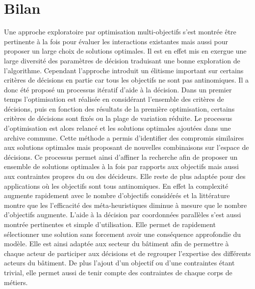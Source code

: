 \section{Bilan} %
\label{sec:bilan_aide_decision}
Une approche exploratoire par optimisation multi-objectifs s’est montrée être pertinente à
la fois pour évaluer les interactions existantes mais aussi pour proposer un large choix
de solutions optimales. Il est en effet mis en exergue une large diversité des paramètres
de décision traduisant une bonne exploration de l’algorithme. Cependant l’approche
introduit un élitisme important sur certains critères de décisions en partie car tous les
objectifs ne sont pas antinomiques. Il a donc été proposé un processus itératif d’aide à
la décision. Dans un premier temps l’optimisation est réalisée en considérant l’ensemble
des critères de décisions, puis en fonction des résultats de la première optimisation,
certains critères de décisions sont fixés ou la plage de variation réduite. Le processus
d’optimisation est alors relancé et les solutions optimales ajoutées dans une archive
commune. Cette méthode a permis d’identifier des compromis similaires aux solutions
optimales mais proposant de nouvelles combinaisons sur l’espace de décisions. Ce processus
permet ainsi d’affiner la recherche afin de proposer un ensemble de solutions optimales à
la fois par rapports aux objectifs mais aussi aux contraintes propres du ou des décideurs.
Elle reste de plus adaptée pour des applications où les objectifs sont tous antinomiques.
En effet la complexité augmente rapidement avec le nombre d’objectifs considérés et la
littérature montre que les l’efficacité des méta-heuristiques diminue à mesure que le
nombre d’objectifs augmente. L’aide à la décision par coordonnées parallèles s’est aussi
montrée pertinentes et simple d’utilisation. Elle permet de rapidement sélectionner une
solution sans forcement avoir une conséquence approfondie du modèle. Elle est ainsi
adaptée aux secteur du bâtiment afin de permettre à chaque acteur de participer aux
décisions et de regrouper l’expertise des différents acteurs du bâtiment. De plus l’ajout d’un objectif
ou d’une contraintes étant trivial, elle permet aussi de tenir compte des contraintes de chaque corps de métiers.

